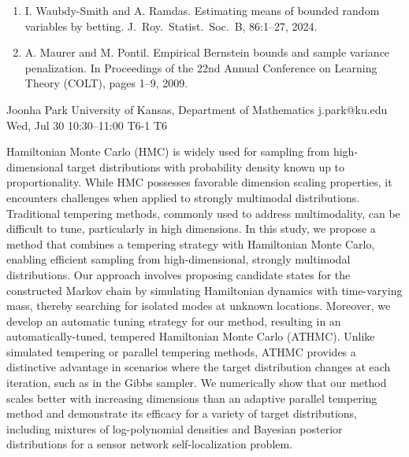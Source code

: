 \begin{talk}
\begin{enumerate}
 \item[{[1]}] I. Waubdy-Smith and A. Ramdas. Estimating means of bounded random
variables by betting. J.\ Roy.\ Statist.\ Soc.\ B, 86:1--27, 2024.
 \item[{[2]}] A. Maurer and M. Pontil. Empirical Bernstein bounds and sample variance penalization. In Proceedings of the 22nd Annual Conference
on Learning Theory (COLT), pages 1--9, 2009.
\end{enumerate}


\end{talk}

\begin{talk}
  {Joonha Park}%
  {University of Kansas, Department of Mathematics}%
  {j.park@ku.edu}%
  {}%
  {}%
  {}%
  {Wed, Jul 30 10:30--11:00}%
  {T6-1}%
  {T6}%
  {}%
  
    

Hamiltonian Monte Carlo (HMC) is widely used for sampling from high-dimensional target distributions with probability density known up to proportionality. While HMC possesses favorable dimension scaling properties, it encounters challenges when applied to strongly multimodal distributions. Traditional tempering methods, commonly used to address multimodality, can be diﬃcult to tune, particularly in high dimensions. In this study, we propose a method that combines a tempering strategy with Hamiltonian Monte Carlo, enabling eﬃcient sampling from high-dimensional, strongly multimodal distributions. Our approach involves proposing candidate states for the constructed Markov chain by simulating Hamiltonian dynamics with time-varying mass, thereby searching for isolated modes at unknown locations. Moreover, we develop an automatic tuning strategy for our method, resulting in an automatically-tuned, tempered Hamiltonian Monte Carlo (ATHMC). Unlike simulated tempering or parallel tempering methods, ATHMC provides a distinctive advantage in scenarios where the target distribution changes at each iteration, such as in the Gibbs sampler. We numerically show that our method scales better with increasing dimensions than an adaptive parallel tempering method and demonstrate its eﬃcacy for a variety of target distributions, including mixtures of log-polynomial densities and Bayesian posterior distributions for a sensor network self-localization problem.
   
\end{talk}

